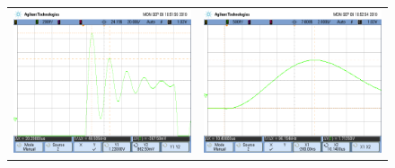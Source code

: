\begin{figure}[H]
    \centering
    \begin{tabular}{c c}
        \includegraphics[scale=0.2]{../Mediciones/Osciloscopio/Pasabajos_respuesta_caso_0/scope_9.png} &
        \includegraphics[scale=0.2]{../Mediciones/Osciloscopio/Pasabajos_respuesta_caso_0/scope_10.png} \\
    \end{tabular}

\end{figure}
